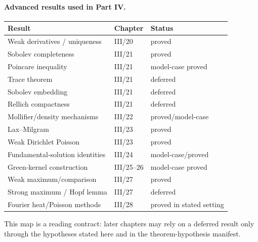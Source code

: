 \paragraph{Advanced results used in Part IV.}
\begin{center}
\begin{tabular}{lll}
\textbf{Result} & \textbf{Chapter} & \textbf{Status}\\
\hline
Weak derivatives / uniqueness & III/20 & proved\\
Sobolev completeness & III/21 & proved\\
Poincare inequality & III/21 & model-case proved\\
Trace theorem & III/21 & deferred\\
Sobolev embedding & III/21 & deferred\\
Rellich compactness & III/21 & deferred\\
Mollifier/density mechanisms & III/22 & proved/model-case\\
Lax--Milgram & III/23 & proved\\
Weak Dirichlet Poisson & III/23 & proved\\
Fundamental-solution identities & III/24 & model-case/proved\\
Green-kernel construction & III/25--26 & model-case proved\\
Weak maximum/comparison & III/27 & proved\\
Strong maximum / Hopf lemma & III/27 & deferred\\
Fourier heat/Poisson methods & III/28 & proved in stated setting
\end{tabular}
\end{center}

This map is a reading contract: later chapters may rely on a deferred result
only through the hypotheses stated here and in the theorem-hypothesis manifest.
